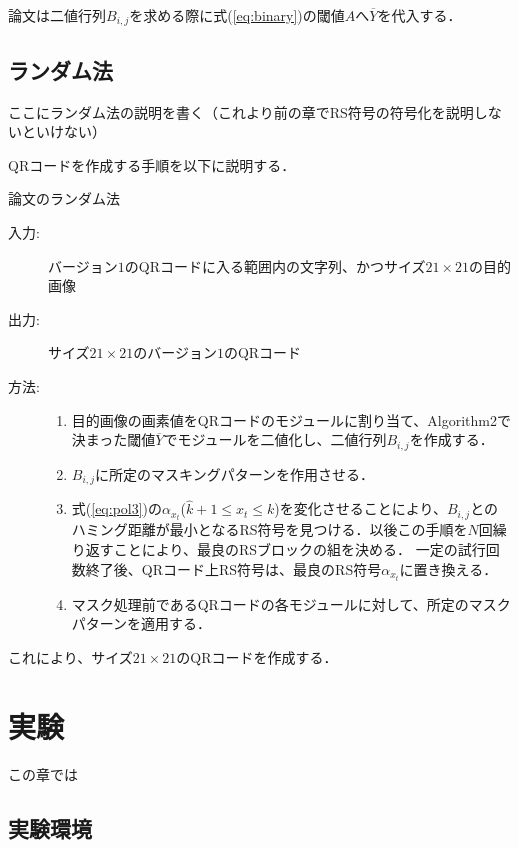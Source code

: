\documentclass{thesis}
\begin{document}
論文\cite{KURI}は二値行列$B_{i,j}$を求める際に式(\ref{eq:binary})の閾値$A$へ$\overline{Y}$を代入する．


\section{ランダム法}
ここにランダム法の説明を書く（これより前の章でRS符号の符号化を説明しないといけない）

QRコードを作成する手順を以下に説明する．

\begin{algorithm}                      
\caption{論文\cite{KURI}のランダム法}         
\label{alg:alg3} 
\begin{description}
\item[入力:] バージョン$1$のQRコードに入る範囲内の文字列、かつサイズ$21 \times 21$の目的画像
\item[出力:] サイズ$21 \times 21$のバージョン$1$のQRコード
\item[方法:]
\begin{enumerate}
\item
目的画像の画素値をQRコードのモジュールに割り当て、Algorithm2で決まった閾値$\overline{Y}$でモジュールを二値化し、二値行列$B_{i,j}$を作成する．
\item
$B_{i,j}$に所定のマスキングパターンを作用させる．
\item
式(\ref{eq:pol3})の$\alpha_{x_t}$($\hat{k} + 1 \leq x_t \leq k $)を変化させることにより、$B_{i,j}$とのハミング距離が最小となるRS符号を見つける．以後この手順を$N$回繰り返すことにより、最良のRSブロックの組を決める．
一定の試行回数終了後、QRコード上RS符号は、最良のRS符号$\alpha_{x_t}$に置き換える．
\item
マスク処理前であるQRコードの各モジュールに対して、所定のマスクパターンを適用する．
\end{enumerate}
\end{description}
\end{algorithm} 
これにより、サイズ$21 \times 21$のQRコードを作成する．


\chapter{実験}

この章では

\section{実験環境}
\end{document}
